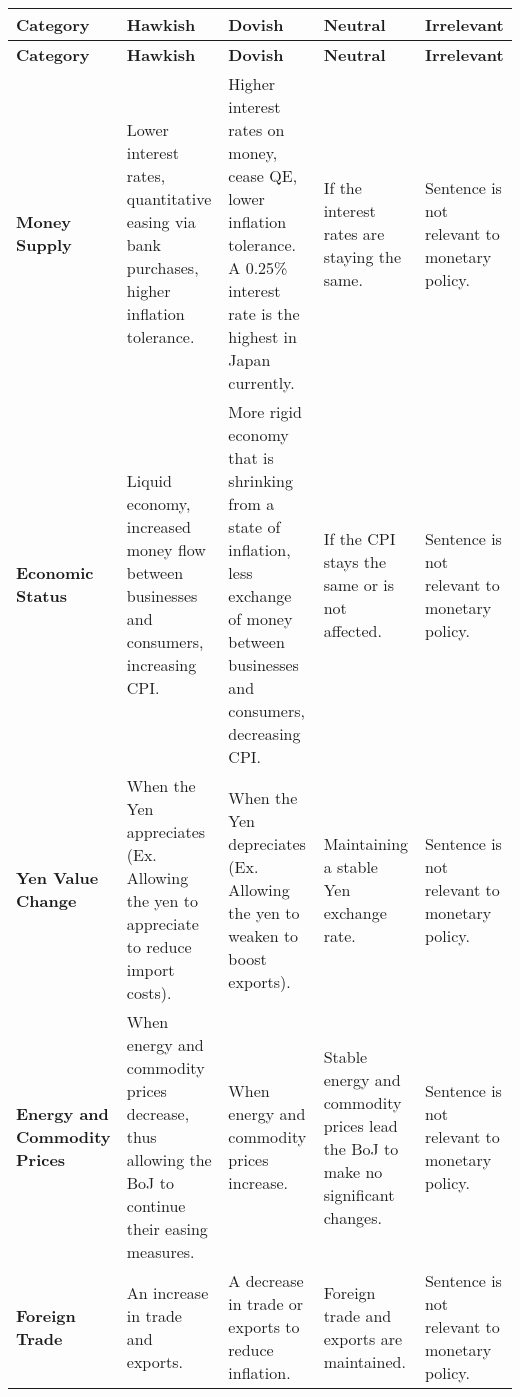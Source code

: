 \newpage

\begin{longtable}{p{}p{}p{}p{}p{}}
\caption{} \\
\toprule
\textbf{Category} & \textbf{Hawkish} & \textbf{Dovish} & \textbf{Neutral} & \textbf{Irrelevant} \\
\midrule
\endfirsthead

\toprule
\textbf{Category} & \textbf{Hawkish} & \textbf{Dovish} & \textbf{Neutral} & \textbf{Irrelevant} \\
\midrule
\endhead

\textbf{Money Supply} & Lower interest rates, quantitative easing via bank purchases, higher inflation tolerance. & Higher interest rates on money, cease QE, lower inflation tolerance. A 0.25\% interest rate is the highest in Japan currently. & If the interest rates are staying the same. & Sentence is not relevant to monetary policy. \\
\midrule

\textbf{Economic Status} & Liquid economy, increased money flow between businesses and consumers, increasing CPI. & More rigid economy that is shrinking from a state of inflation, less exchange of money between businesses and consumers, decreasing CPI. & If the CPI stays the same or is not affected. & Sentence is not relevant to monetary policy. \\
\midrule

\textbf{Yen Value Change} & When the Yen appreciates (Ex. Allowing the yen to appreciate to reduce import costs). & When the Yen depreciates (Ex. Allowing the yen to weaken to boost exports). & Maintaining a stable Yen exchange rate. & Sentence is not relevant to monetary policy. \\
\midrule

\textbf{Energy and Commodity Prices} & When energy and commodity prices decrease, thus allowing the BoJ to continue their easing measures. & When energy and commodity prices increase. & Stable energy and commodity prices lead the BoJ to make no significant changes. & Sentence is not relevant to monetary policy. \\
\midrule

\textbf{Foreign Trade} & An increase in trade and exports. & A decrease in trade or exports to reduce inflation. & Foreign trade and exports are maintained. & Sentence is not relevant to monetary policy. \\
\midrule


\end{longtable}
